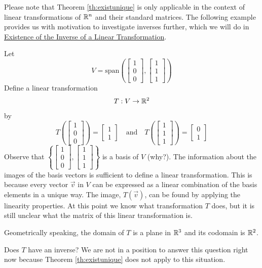 \documentclass{ximera}
\begin{document}
Please note that Theorem \ref{th:existunique} is only applicable in the context of linear transformations of $\mathbb{R}^n$ and their standard matrices.  The following example provides us with motivation to investigate inverses further, which we will do in \href{https://ximera.osu.edu/linearalgebradzv3/LinearAlgebraInteractiveIntro/LTR-0035/main}{Existence of the Inverse of a Linear Transformation}.

\begin{exploration}\label{init:subtosub}
Let $$V=\text{span}\left(\begin{bmatrix}1\\0\\0\end{bmatrix}, \begin{bmatrix}1\\1\\1\end{bmatrix}\right)$$
Define a linear transformation $$T:V\rightarrow \mathbb{R}^2$$
by $$T\left(\begin{bmatrix}1\\0\\0\end{bmatrix}\right)=\begin{bmatrix}1\\1\end{bmatrix}\quad \text{and} \quad T\left(\begin{bmatrix}1\\1\\1\end{bmatrix}\right)=\begin{bmatrix}0\\1\end{bmatrix}$$
Observe that $\left\{\begin{bmatrix}1\\0\\0\end{bmatrix}, \begin{bmatrix}1\\1\\1\end{bmatrix}\right\}$ is a basis of $V$ (why?). The information about the images of the basis vectors is sufficient to define a linear transformation.  This is because every vector $\vec{v}$ in $V$ can be expressed as a linear combination of the basis elements in a unique way.  The image, $T(\vec{v})$, can be found by applying the linearity properties.
At this point we know what transformation $T$ does, but it is still unclear what the matrix of this linear transformation is.

Geometrically speaking, the domain of $T$ is a plane in $\mathbb{R}^3$ and its codomain is $\mathbb{R}^2$.  

Does $T$ have an inverse?  We are not in a position to answer this question right now because Theorem \ref{th:existunique} does not apply to this situation. 
\end{exploration}
\end{document}
